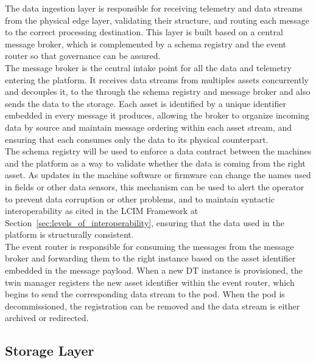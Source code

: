 The data ingestion layer is responsible for receiving telemetry and data streams from the physical edge layer, validating their structure, and routing each message to the correct processing destination. This layer is built based on a central message broker, which is complemented by a schema registry and the event router so that governance can be assured. \\
The message broker is the central intake point for all the data and telemetry entering the platform. It receives data streams from multiples assets concurrently and decouples it, to the \DTPods through the schema registry and message broker and also sends the data to the storage. Each asset is identified by a unique identifier embedded in every message it produces, allowing the broker to organize incoming data by source and maintain message ordering within each asset stream, and ensuring that each \DTPod consumes only the data to its physical counterpart.\\
The schema registry will be used to enforce a data contract between the machines and the platform as a way to validate whether the data is coming from the right asset. As updates in the machine software or firmware can change the names used in fields or other data sensors, this mechanism can be used to alert the operator to prevent data corruption or other problems, and to maintain syntactic interoperability as cited in the LCIM Framework at Section~\ref{sec:levels_of_interoperability}, ensuring that the data used in the platform is structurally consistent.\\
The event router is responsible for consuming the messages from the message broker and forwarding them to the right \DTPod instance based on the asset identifier embedded in the message payload. When a new DT instance is provisioned, the twin manager registers the new asset identifier within the event router, which begins to send the corresponding data stream to the pod. When the pod is decommissioned, the registration can be removed and the data stream is either archived or redirected.

\subsection{Storage Layer}

